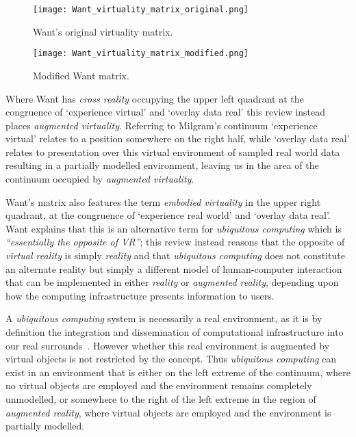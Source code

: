 \begin{figure}[h]
\centering
\begin{minipage}{.5\textwidth}
 	\centering
 	\texttt{[image: Want\_virtuality\_matrix\_original.png]}
 	\caption{Want's original virtuality matrix.}
	\label{original_virtuality_matrix.png}
\end{minipage}%
\begin{minipage}{.5\textwidth}
  \centering
  \texttt{[image: Want\_virtuality\_matrix\_modified.png]}
    \caption{Modified Want matrix.}
    \label{modified_virtuality_matrix.png}
\end{minipage}
\end{figure}

Where Want has \textit{cross reality} occupying the upper left quadrant at the congruence of `experience virtual' and `overlay data real' this review instead places \textit{augmented virtuality}. Referring to Milgram's continuum `experience virtual' relates to a position somewhere on the right half, while `overlay data real' relates to presentation over this virtual environment of sampled real world data resulting in a partially modelled environment, leaving us in the area of the continuum occupied by \textit{augmented virtuality}.

Want's matrix also features the term \textit{embodied virtuality} in the upper right quadrant, at the congruence of `experience real world' and `overlay data real'. Want explains that this is an alternative term for \textit{ubiquitous computing} which is \textit{``essentially the opposite of VR''}; this review instead reasons that the opposite of \textit{virtual reality} is simply \textit{reality} and that \textit{ubiquitous computing} does not constitute an alternate reality but simply a different model of human-computer interaction that can be implemented in either \textit{reality} or \textit{augmented reality}, depending upon how the computing infrastructure presents information to users.

A \textit{ubiquitous computing} system is necessarily a real environment, as it is by definition the integration and dissemination of computational infrastructure into our real surrounds~\cite{York2004}. However whether this real environment is augmented by virtual objects is not restricted by the concept. Thus \textit{ubiquitous computing} can exist in an environment that is either on the left extreme of the continuum, where no virtual objects are employed and the environment remains completely unmodelled, or somewhere to the right of the left extreme in the region of \textit{augmented reality}, where virtual objects are employed and the environment is partially modelled.

